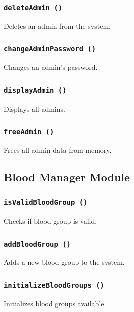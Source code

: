 \documentclass[12pt,a4paper]{report}
\begin{document}
\subsubsection{\texttt{deleteAdmin ()}}
Deletes an admin from the system.


\subsubsection{\texttt{changeAdminPassword ()}}
Changes an admin's password.


\subsubsection{\texttt{displayAdmin ()}}
Displays all admins.


\subsubsection{\texttt{freeAdmin ()}}
Frees all admin data from memory.


\subsection{Blood Manager Module}
\subsubsection{\texttt{isValidBloodGroup ()}}
Checks if blood group is valid.


\subsubsection{\texttt{addBloodGroup ()}}
Adds a new blood group to the system.


\subsubsection{\texttt{initializeBloodGroups ()}}
Initializes blood groups available.

\end{document}

